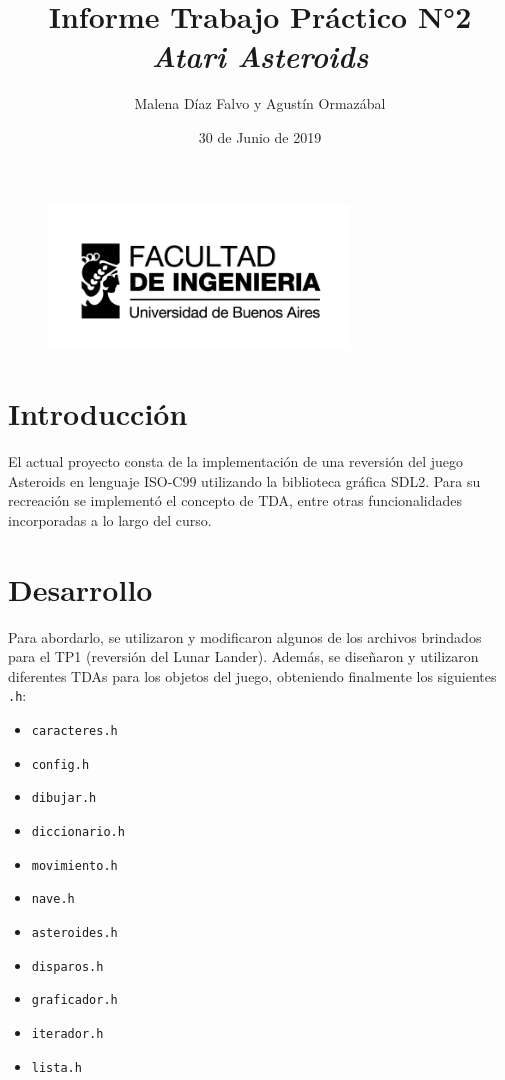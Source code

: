 \documentclass[a4paper, 12pt, spanish]{article}
\title{Informe Trabajo Práctico N°2 \linebreak \textit{Atari Asteroids} \linebreak}
\author{Malena Díaz Falvo y Agustín Ormazábal}
\date{30 de Junio de 2019}
\begin{document}
\begin{figure}[t]
	\includegraphics[width=8cm]{logoFIUBA} 
\end{figure}

\maketitle

\thispagestyle{empty}
\newpage

\setcounter{page}{1}
\pagestyle{fancy}
\fancyhf{}
\cfoot{\thepage}
\renewcommand{\footrulewidth}{0pt}




\section*{Introducción}
El actual proyecto consta de la implementación de una reversión del juego
Asteroids en lenguaje ISO-C99 utilizando la biblioteca gráfica SDL2. Para su recreación
se implementó el concepto de TDA, entre otras funcionalidades incorporadas a lo largo
del curso. \newline
 
\section*{Desarrollo}
Para abordarlo, se utilizaron y modificaron algunos de los archivos brindados para el TP1 (reversión del Lunar 
Lander). Además, se diseñaron y utilizaron diferentes TDAs para los objetos del juego, obteniendo finalmente los siguientes \texttt{.h}:

\begin{multicols}{2}
\begin{itemize}[label=$\bullet$]

	\item \texttt{caracteres.h}
	\item \texttt{config.h} 
	\item \texttt{dibujar.h}
	\item \texttt{diccionario.h}
	\item \texttt{movimiento.h}
	\item \texttt{nave.h}
	\item \texttt{asteroides.h}
	\item \texttt{disparos.h}
	\item \texttt{graficador.h}
	\item \texttt{iterador.h}
	\item \texttt{lista.h}
	

\end{itemize}
\end{multicols}
\medskip
\end{document}

